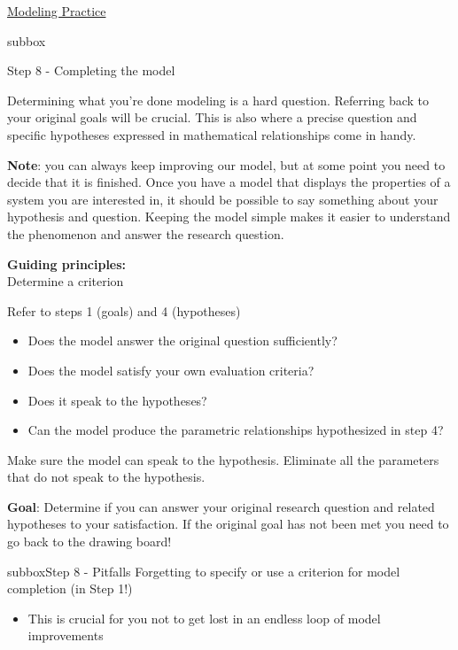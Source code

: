 \begin{textbox}{\href{https://compneuro.neuromatch.io/projects/modelingsteps/ModelingSteps_5through10.html}{Modeling Practice  } }

\begin{subbox}{subbox}{Step 8 - Completing the model

}
\scriptsize
Determining what you're done modeling is a hard question. Referring back to your original goals will be crucial. This is also where a precise question and specific hypotheses expressed in mathematical relationships come in handy. 

\textbf{Note}: you can always keep improving our model, but at some point you need to decide that it is finished. Once you have a model that displays the properties of a system you are interested in, it should be possible to say something about your hypothesis and question. Keeping the model simple makes it easier to understand the phenomenon and answer the research question. 

\textbf{Guiding principles:}\\
Determine a criterion

Refer to steps 1 (goals) and 4 (hypotheses)
\begin{itemize}
    \item 
 Does the model answer the original question sufficiently?
   \item  Does the model satisfy your own evaluation criteria?
  \item  Does it speak to the hypotheses?
 \item  Can the model produce the parametric relationships hypothesized in step 4?
\end{itemize}
  
Make sure the model can speak to the hypothesis. Eliminate all the parameters that do not speak to the hypothesis.

\textbf{Goal}: Determine if you can answer your original research question and related hypotheses to your satisfaction. If the original goal has not been met you need to go back to the drawing board!
  \end{subbox}
\begin{subbox}{subbox}{Step 8 - Pitfalls }
\scriptsize
Forgetting to specify or use a criterion for model completion (in Step 1!)
\begin{itemize}
    \item This is crucial for you not to get lost in an endless loop of model improvements\end{itemize}
  


\end{subbox}
\end{textbox}

